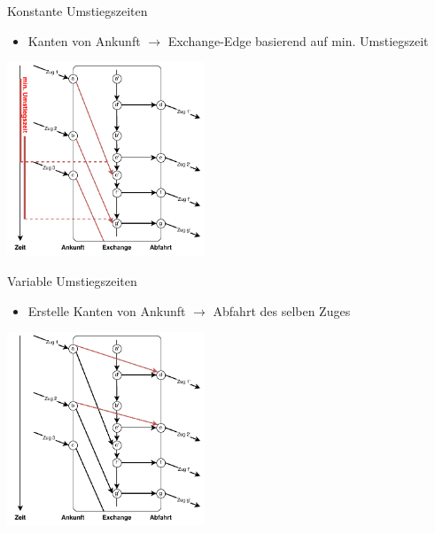 \begin{frame}{Konstante Umstiegszeiten}
	\begin{itemize}
		\item Kanten von Ankunft $\rightarrow$ Exchange-Edge basierend auf min. Umstiegszeit
	\end{itemize}

	\begin{center}
		\includegraphics[height=5.8cm]{images/time_expanded_constant_interchange_2.pdf} 
	\end{center}
\end{frame}


\begin{frame}{Variable Umstiegszeiten}
	\begin{itemize}
		 \item Erstelle Kanten von Ankunft $\rightarrow$ Abfahrt des selben Zuges
	\end{itemize}

	\begin{center}
		\includegraphics[height=5.8cm]{images/time_expanded_constant_interchange_3.pdf} 
	\end{center}
\end{frame}




